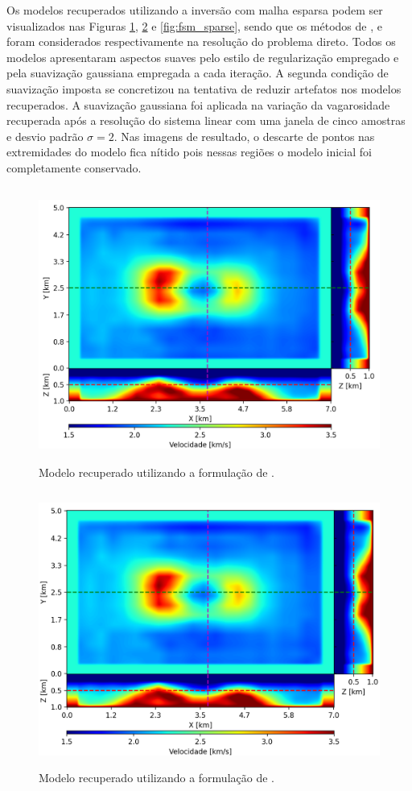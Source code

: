 Os modelos recuperados utilizando a inversão com malha esparsa podem ser visualizados nas Figuras \ref{fig:pod_sparse}, \ref{fig:fim_sparse} e \ref{fig:fsm_sparse}, sendo que os métodos de ,  e  foram considerados respectivamente na resolução do problema direto. Todos os modelos apresentaram aspectos suaves pelo estilo de regularização empregado e pela suavização gaussiana empregada a cada iteração. A segunda condição de suavização imposta se concretizou na tentativa de reduzir artefatos nos modelos recuperados. A suavização gaussiana foi aplicada na variação da vagarosidade recuperada após a resolução do sistema linear com uma janela de cinco amostras e desvio padrão $\sigma = 2$. Nas imagens de resultado, o descarte de pontos nas extremidades do modelo fica nítido pois nessas regiões o modelo inicial foi completamente conservado.

\begin{figure}[H]
	\centering
	\includegraphics[width=12cm,height=9cm]{Imgs/Resultados/pod_sparse.png}
	\caption{Modelo recuperado utilizando a formulação de .}
	\label{fig:pod_sparse}	
\end{figure}

\begin{figure}[H]
	\centering
	\includegraphics[width=12cm,height=9cm]{Imgs/Resultados/fim_sparse.png}
	\caption{Modelo recuperado utilizando a formulação de .}
	\label{fig:fim_sparse}	
\end{figure}

